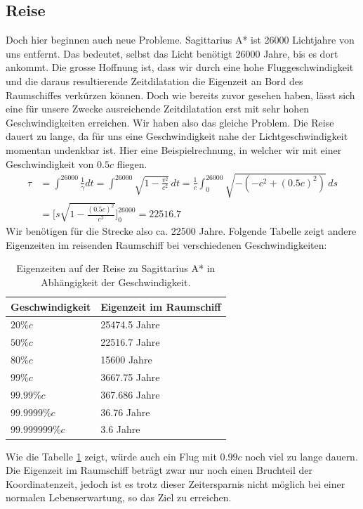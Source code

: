 \begin{refsection}
    \subsection{Reise}
    Doch hier beginnen auch neue Probleme. Sagittarius A* ist 26000 Lichtjahre von uns entfernt. Das bedeutet, selbst das Licht benötigt 26000 Jahre, bis es dort ankommt. Die grosse Hoffnung ist, dass wir durch eine hohe Fluggeschwindigkeit und die daraus resultierende Zeitdilatation die Eigenzeit an Bord des Raumschiffes verkürzen können. 
    Doch wie bereits zuvor gesehen haben, lässt sich eine für unsere Zwecke ausreichende Zeitdilatation erst mit sehr hohen Geschwindigkeiten erreichen. Wir haben also das gleiche Problem. Die Reise dauert zu lange, da für uns eine Geschwindigkeit nahe der Lichtgeschwindigkeit momentan undenkbar ist.
    Hier eine Beispielrechnung, in welcher wir mit einer Geschwindigkeit von $0.5c$ fliegen.
	\begin{align*}
	\tau
	&= 
	\int_{}^{26000}\frac{1}{\gamma}dt=\int_{}^{26000}\sqrt{1-\frac{v^2}{c^2}}\,dt
	= 
	\frac{1}{c}\int_{0}^{26000}\sqrt{-(-c^2+(0.5c)^2)}\,ds\\
	&=
	\biggl[s\sqrt{1-\frac{(0.5c)^{2}}{c^2}}\biggr]_0^{26000}
	=
	22516.7
	\end{align*}
	Wir benötigen für die Strecke also ca. 22500 Jahre.
	Folgende Tabelle zeigt andere Eigenzeiten im reisenden Raumschiff bei verschiedenen Geschwindigkeiten:
    \begin{table}[H]
         \begin{center}
            \begin{tabular}{ | l | l |}
            \hline
            Geschwindigkeit & Eigenzeit im Raumschiff \\ \hline
            $20\%c$ & 25474.5 Jahre \\ 
            $50\%c$ & 22516.7 Jahre \\
            $80\%c$ & 15600 Jahre \\ 
            $99\%c$ & 3667.75 Jahre \\ 
            $99.99\%c$ & 367.686 Jahre \\ 
            $99.9999\%c$ & 36.76 Jahre \\ 
            $99.999999\%c$ & 3.6 Jahre \\ \hline
             \end{tabular}
        \end{center}
    \caption{Eigenzeiten auf der Reise zu Sagittarius A* in Abhängigkeit der Geschwindigkeit.}
    \label{table:eigenzeiten}
    \end{table}
    \noindent
	Wie die Tabelle \ref{table:eigenzeiten} zeigt, würde auch ein Flug mit $0.99c$ noch viel zu lange dauern. 
	Die Eigenzeit im Raumschiff beträgt zwar nur noch einen Bruchteil der Koordinatenzeit, jedoch ist es trotz dieser Zeitersparnis nicht möglich bei einer normalen Lebenserwartung, so das Ziel zu erreichen.
    

\end{refsection}
